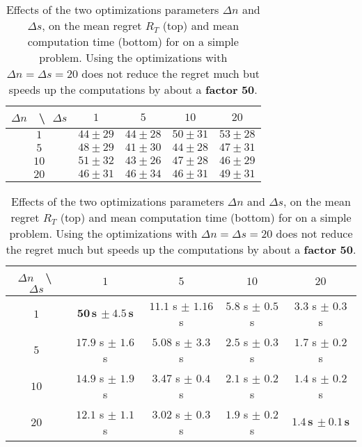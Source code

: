 \begin{small} %
\begin{table}[ht]
    \begin{small} %
    \centering
        \begin{tabular}{c|cccc}
            $\Delta n$ $\;$ \textbackslash $\;$ $\Delta s$ & $1$ & $5$ & $10$ & $20$ \\
            \hline
            $1$ & $44 \pm 29$ & $44 \pm 28$ & $50 \pm 31$ & $53 \pm 28$ \\
            $5$ & $48 \pm 29$ & $41 \pm 30$ & $44 \pm 28$ & $47 \pm 31$ \\
            $10$ & $51 \pm 32$ & $43 \pm 26$ & $47 \pm 28$ & $46 \pm 29$ \\
            $20$ & $46 \pm 31$ & $46 \pm 34$ & $46 \pm 31$ & $49 \pm 31$
        \end{tabular}
    \hspace{0.5cm}

        \begin{tabular}{c|cccc}
            $\Delta n$ $\;$ \textbackslash $\;$ $\Delta s$
            & $1$ & $5$ & $10$ & $20$ \\
            \hline
            $1$ & $\mathbf{50 \,\text{s}\, \pm 4.5 \,\text{s}}$ & $11.1$ s $\pm$ $1.16$ s & $5.8$ s $\pm$ $0.5$ s & $3.3$ s $\pm$ $0.3$ s \\
            $5$ & $17.9$ s $\pm$ $1.6$ s & $5.08$ s $\pm$ $3.3$ s & $2.5$ s $\pm$ $0.3$ s & $1.7$ s $\pm$ $0.2$ s  \\
            $10$ & $14.9$ s $\pm$ $1.9$ s & $3.47$ s $\pm$ $0.4$ s & $2.1$ s $\pm$ $0.2$ s & $1.4$ s $\pm$ $0.2$ s \\
            $20$ & $12.1$ s $\pm$ $1.1$ s & $3.02$ s $\pm$ $0.3$ s & $1.9$ s $\pm$ $0.2$ s & $\mathbf{1.4 \,\text{s}\, \pm 0.1 \,\text{s}}$
        \end{tabular}
    \caption{Effects of the two optimizations parameters $\Delta n$ and $\Delta s$, on the mean regret $R_T$ (top) and mean computation time (bottom) for \GLRklUCB{} on a simple problem. Using the optimizations with $\Delta n = \Delta s = 20$ does not reduce the regret much but speeds up the computations by about a \textbf{factor} $\mathbf{50}$.}
    \label{table:6:effectOptimizations}
    \end{small} %
\end{table}
\end{small} %


